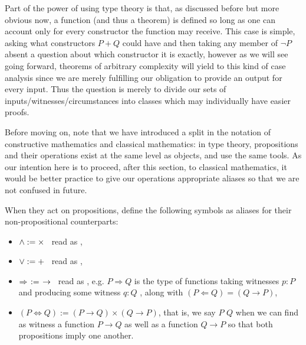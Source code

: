 \documentclass[11pt]{article}
\begin{document}
Part of the power of using type theory is that, as discussed before but more obvious now, a function (and thus a theorem) is defined so long as one can account only for every constructor the function may receive. This case is simple, asking what constructors $P + Q$ could have and then taking any member of $\neg P$ absent a question about which constructor it is exactly, however as we will see going forward, theorems of arbitrary complexity will yield to this kind of case analysis since we are merely fulfilling our obligation to provide an output for every input. Thus the question  is merely to divide our sets of inputs/witnesses/circumstances into classes which may individually have easier proofs.

Before moving on, note that we have introduced a split in the notation of constructive mathematics and classical mathematics: in type theory, propositions and their operations exist at the same level as objects, and use the same tools. As our intention here is to proceed, after this section, to classical mathematics, it would be better practice to give our operations appropriate aliases so that we are not confused in future.

\begin{notation}
When they act on propositions, define the following symbols as aliases for their non-propositional counterparts:
\begin{itemize}
\item $\wedge := \times \hspace{0.5em}$ read as ,
\item $\vee := + \hspace{0.5em}$ read as ,
\item $\Rightarrow \hspace{4pt} := \hspace{4pt} \to \hspace{0.5em}$ read as , e.g. $P \Rightarrow Q$ is the type of functions taking witnesses $p \colon P$ and producing some witness $q \colon Q$ , along with $(P \Leftarrow Q) = (Q \rightarrow P)$,
\item $(P \Leftrightarrow Q) := (P \to Q) \times (Q \to P)$, that is, we say $P$  $Q$ when we can find as witness a function $P \to Q$ as well as a function $Q \to P$ so that both propositions imply one another. 
\end{itemize}
\end{notation}
\end{document}
